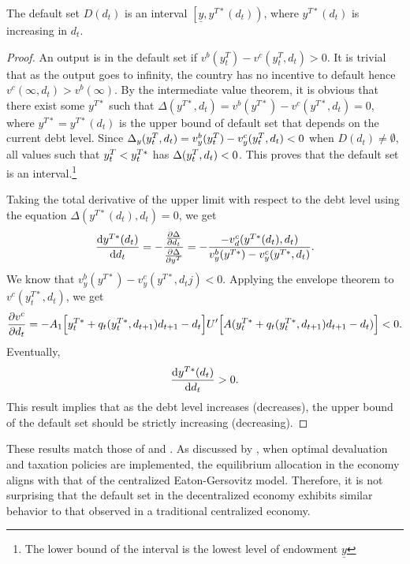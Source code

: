 \begin{proposition}
    \label{prop3}
    The default set $D(d_t)$ is an interval $\left[\underline{y}, y^{T*}(d_t) \right)$, where $y^{T*}(d_t)$ is increasing in $d_t$.
\end{proposition}
\begin{proof}
    An output is in the default set if $v^b(y^T_t) - v^c(y^T_t, d_t) >0$. It is trivial that as the output goes to infinity, the country has no incentive to default hence $v^c(\infty, d_t) > v^b(\infty)$. By the intermediate value theorem, it is obvious that there exist some $y^{T*}$ such that $\Delta(y^{T*}, d_t) = v^b(y^{T*}) - v^c(y^{T*}, d_t) = 0$, where $y^{T*} = y^{T*}(d_t)$ is the upper bound of default set that depends on the current debt level. Since  $\Delta_y(y^T_{t}, d_t) = v^b_y(y^T_{t}) - v^c_y(y^T_t, d_t) < 0$ when $D(d_t) \ne \emptyset$, all values such that  $y^T_{t} < y^{T*}_t$ has $\Delta(y^T_{t}, d_t) <0$. This proves that the default set is an interval.\footnote{The lower bound of the interval is the lowest level of endowment $\underline{y}$}

    Taking the total derivative of the upper limit with respect to the debt level using the equation $\Delta(y^{T*}(d_t), d_t) = 0$, we get
    \begin{equation*}
        \dv{y^{T*}(d_t)}{d_t} = - \frac{\pdv{\Delta}{d_t}}{\pdv{\Delta}{y^{T}}} = - \frac{-v^c_d(y^{T*}(d_t), d_t)}{v^b_y(y^{T*}) - v^c_y(y^{T*}, d_t)}.
    \end{equation*}
    We know that $v^b_y(y^{T*}) - v^c_y(y^{T*}, d_tj) < 0$. Applying the envelope theorem to $v^c(y^{T*}_t, d_t)$, we get
    \begin{equation*}
        \pdv{v^c}{d_t} = -A_1\Big[y^{T*}_t + q_t(y^{T*}_t, d_{t+1})d_{t+1} - d_t\Big] U'\Big[A(y^{T*}_t + q_t(y^{T*}_t, d_{t+1})d_{t+1} - d_t)\Big]<0.
    \end{equation*}
    Eventually,
    \begin{equation}
        \dv{y^{T*}(d_t)}{d_t} > 0.
    \end{equation}
    This result implies that as the debt level increases (decreases), the upper bound of the default set should be strictly increasing (decreasing).
\end{proof}

These results match those of \citet{Arellano-08} and \citet{Uribe-Schmitt-Grohe-textbook}. As discussed by \citet{Na-18}, when optimal devaluation and taxation policies are implemented, the equilibrium allocation in the economy aligns with that of the centralized Eaton-Gersovitz model. Therefore, it is not surprising that the default set in the decentralized economy exhibits similar behavior to that observed in a traditional centralized economy.
